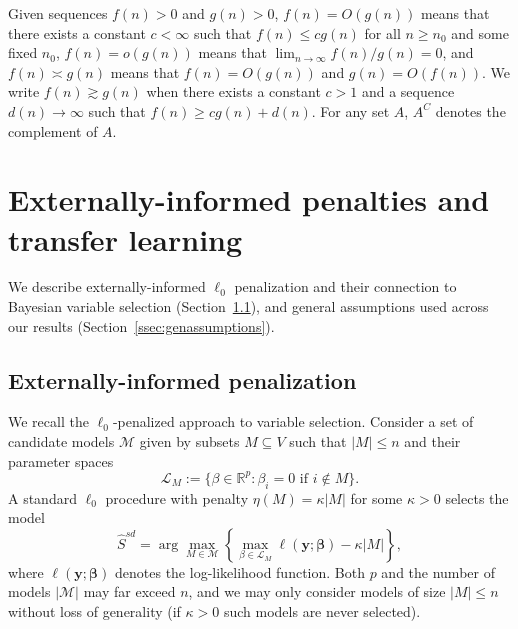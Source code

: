 \documentclass[
  12pt]{article}
\newcommand{\R}{\mathbb{R}}
\newcommand{\M}{\mathcal{M}}
\newcommand{\by}{\mathbf{y}}
\newcommand{\bbeta}{\boldsymbol{\beta}}
\begin{document}
Given sequences $f(n) > 0$ and $g(n) >0$, $f(n)=O(g(n))$ means that there exists a constant $c<\infty$ such that $f(n) \leq c g(n)$ for all $n \geq n_0$ and some fixed $n_0$, $f(n)=o(g(n))$ means that $\lim_{n\to\infty}f(n)/g(n)=0$, and $f(n)\asymp g(n)$ means that $f(n) = O(g(n))$ and $g(n) = O(f(n))$. We write $f(n) \gtrsim g(n)$ when there exists a constant $c>1$ and a sequence $d(n)\to\infty$ such that $f(n) \geq c g(n)+d(n)$. For any set $A$, $A^C$ denotes the complement of $A$.

\section{Externally-informed penalties and transfer learning}\label{sec:intro_blockpen} 

We describe externally-informed $\ell_0$ penalization and their connection to Bayesian variable selection (Section~\ref{ssec:intro_blockpen}), and general assumptions used across our results (Section~\ref{ssec:genassumptions}).

\subsection{Externally-informed penalization}\label{ssec:intro_blockpen}

We recall the $\ell_0$-penalized approach to variable selection. Consider a set of candidate models $\M$ given by subsets $M\subseteq V$ such that $|M|\leq n$ and their parameter spaces
\[
\mathcal{L}_M := \{\beta\in \R^p: \beta_i=0 \text{ if } i\notin M\}.
\]
A standard $\ell_0$ procedure with penalty $\eta(M)=\kappa |M|$ for some $\kappa>0$ selects the model
\begin{equation}\label{eq:stdl0}
\hat{S}^{sd}= \arg\max_{M\in \M} \left\{\max_{\beta\in \mathcal{L}_M}\ell(\by; \bbeta)-\kappa |M|\right\},
\end{equation}
where $\ell(\by; \bbeta)$ denotes the log-likelihood function. 
Both $p$ and the number of models $|\mathcal{M}|$ may far exceed $n$, and we may only consider models of size $|M| \leq n$ without loss of generality (if $\kappa>0$ such models are never selected).
\end{document}
